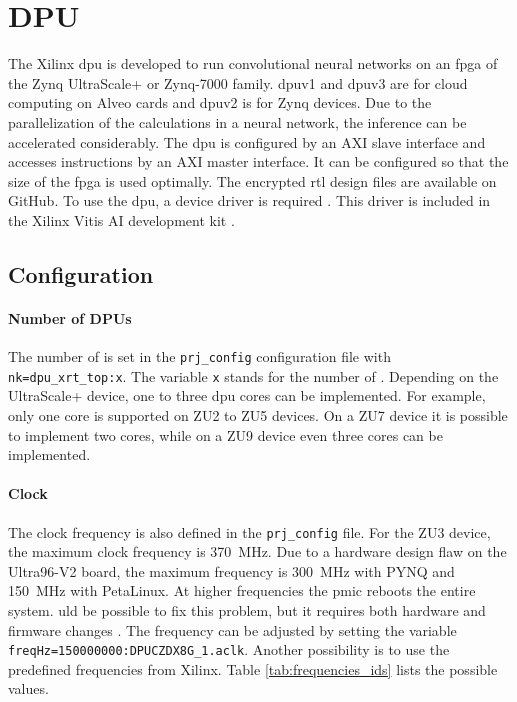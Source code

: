 \section{DPU}
\label{sec:embedded_platform:dpu}

The Xilinx \acrfull{dpu} is developed to run convolutional neural networks on an \acrshort{fpga} of the Zynq UltraScale+ or Zynq-7000 family.
\acrshort{dpu}v1 and \acrshort{dpu}v3 are for cloud computing on Alveo cards and \acrshort{dpu}v2 is for Zynq devices. 
Due to the parallelization of the calculations in a neural network, the inference can be accelerated considerably.
The \acrshort{dpu} is configured by an AXI slave interface and accesses instructions by an AXI master interface.
It can be configured so that the size of the \acrshort{fpga} is used optimally.
The encrypted \acrshort{rtl} design files are available on GitHub.
To use the \acrshort{dpu}, a device driver is required \cite{dpu_product_guide}.
This driver is included in the Xilinx Vitis AI development kit \cite{dpu_product_guide_v3_2}.

\subsection{Configuration}
\label{subsec:embedded_platform:dpu:configuration}
\paragraph{Number of DPUs}
The number of  is set in the \texttt{prj\_config} configuration file with \texttt{nk=dpu\_xrt\_top:x}.
The variable \texttt{x} stands for the number of .
Depending on the UltraScale+ device, one to three \acrshort{dpu} cores can be implemented.
For example, only one core is supported on ZU2 to ZU5 devices.
On a ZU7 device it is possible to implement two cores, while on a ZU9 device even three cores can be implemented.

\paragraph{Clock}
The clock frequency is also defined in the \texttt{prj\_config} file.
For the ZU3 device, the maximum clock frequency is \SI{370}{MHz}.
Due to a hardware design flaw on the Ultra96-V2 board, the maximum frequency is \SI{300}{MHz} with PYNQ and \SI{150}{MHz} with PetaLinux.
At higher frequencies the \acrfull{pmic} reboots the entire system.
uld be possible to fix this problem, but it requires both hardware and firmware changes \cite{pmic_issue}.
The frequency can be adjusted by setting the variable \texttt{freqHz=150000000:DPUCZDX8G\_1.aclk}.
Another possibility is to use the predefined frequencies from Xilinx.
Table \ref{tab:frequencies_ids} lists the possible values.

